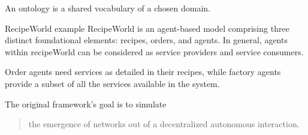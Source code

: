 \begin{frame}[fragile]{\insertsection}
    An ontology is a \alert{shared} vocabulary of a chosen domain.

\end{frame}

\begin{frame}[fragile]{\insertsection}
\end{frame}

\begin{frame}[fragile]{\insertsection}
    \begin{block}{RecipeWorld example}
        RecipeWorld \cite{Fontana2015recipeWorld} is an agent-based model comprising three distinct foundational elements: recipes, orders, and agents. In general, agents within recipeWorld can be considered as \alert{service providers} and \alert{service consumers}.

        \medskip
        \alert{Order} agents need services as detailed in their recipes, while \alert{factory} agents provide a subset of all the services available in the system.

        \medskip
        The original framework's goal is to simulate \blockquote[\cite{Fontana2015recipeWorld}]{the emergence of networks out of a decentralized autonomous interaction.}
    \end{block}
\end{frame}


